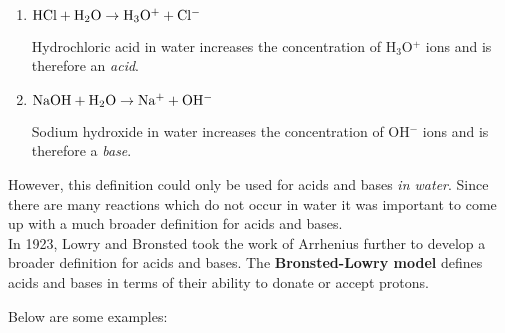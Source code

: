 \begin{enumerate}
\item{
$\rm{HCl + H_{2}O \rightarrow H_{3}O^{+} + Cl^{-}}$

Hydrochloric acid in water increases the concentration of H$_{3}$O$^{+}$ ions and is therefore an \textit{acid}.}

\item{$\rm{NaOH + H_{2}O \rightarrow Na^{+} + OH^{-}}$

Sodium hydroxide in water increases the concentration of OH$^{-}$ ions and is therefore a \textit{base}.}
\end{enumerate}

However, this definition could only be used for acids and bases \textit{in water}. Since there are many reactions which do not occur in water it was important to come up with a much broader definition for acids and bases. \\

In 1923, Lowry and Bronsted took the work of Arrhenius further to develop a broader definition for acids and bases. The \textbf{Bronsted-Lowry model} defines acids and bases in terms of their ability to donate or accept protons.
\vspace{-.5cm}

Below are some examples:

